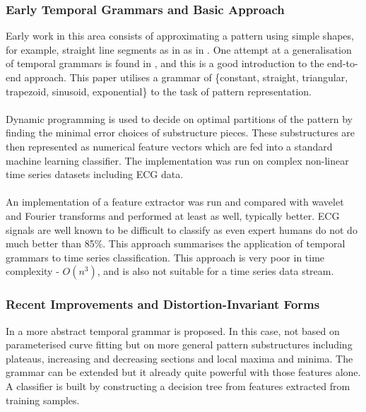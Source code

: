 \documentclass[11pt]{article}
\begin{document}
	\subsubsection{Early Temporal Grammars and Basic Approach}
	Early work in this area consists of approximating a pattern using simple shapes, for example, straight line segments as in as in \citep{keogh1998enhanced}. One attempt at a generalisation of temporal grammars is found in \citep{olszewski2001generalized}, and this is a good introduction to the end-to-end approach. This paper utilises a grammar of \{constant, straight, triangular, trapezoid, sinusoid, exponential\} to the task of pattern representation.
	\paragraph{}
	Dynamic programming is used to decide on optimal partitions of the pattern by finding the minimal error choices of substructure pieces. These substructures are then represented as numerical feature vectors which are fed into a standard machine learning classifier. The implementation was run on complex non-linear time series datasets including ECG data. 
	\paragraph{}
	An implementation of a feature extractor was run and compared with wavelet and Fourier transforms and performed at least as well, typically better. ECG signals are well known to be difficult to classify as even expert humans do not do much better than 85\%. This approach summarises the application of temporal grammars to time series classification. This approach is very poor in time complexity - $O(n^{3})$, and is also not suitable for a time series data stream.
	
	\subsubsection{Recent Improvements and Distortion-Invariant Forms}
	In \citep{kadous2005classification} a more abstract temporal grammar is proposed. In this case, not based on parameterised curve fitting but on more general pattern substructures including plateaus, increasing and decreasing sections and local maxima and minima. The grammar can be extended but it already quite powerful with those features alone. A classifier is built by constructing a decision tree from features extracted from training samples.
\end{document}
